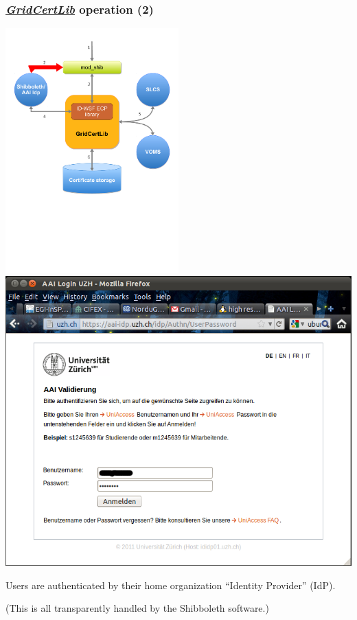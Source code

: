 \documentclass{beamer}
\newcommand{\+}{\vspace{1em}}
\newcommand{\GridCertLib}{\href{http://gridcertlib.googlecode.com/}{{\em GridCertLib}}}
\begin{document}
\begin{frame}
  \frametitle{\GridCertLib{} operation (2)}
  \begin{center}
    \includegraphics[width=0.5\textwidth,viewport=0 300 600 650]{architecture2}
    \includegraphics[height=0.50\textheight]{idp}

    \+ Users are authenticated by their home organization ``Identity
    Provider'' (IdP).

    \+ (This is all transparently handled by the Shibboleth software.)
  \end{center}
\end{frame}
\end{document}
